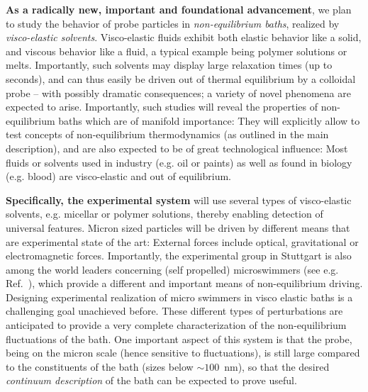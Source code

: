 \begin{workpackage}
\begin{wpdescription}
{\bf As a radically new, important and foundational advancement}, we plan to study the
behavior of probe particles in {\it non-equilibrium baths}, realized by {\it visco-elastic
  solvents}. Visco-elastic fluids exhibit both elastic behavior like a solid, and viscous
behavior like a fluid, a typical example being polymer solutions or melts. Importantly, such
solvents may display large relaxation times (up to seconds), and can thus easily be driven
out of thermal equilibrium by a colloidal probe -- with possibly dramatic consequences; a
variety of novel phenomena are expected to arise. Importantly, such studies will reveal the
properties of non-equilibrium baths which are of manifold importance: They will explicitly
allow to test concepts of non-equilibrium thermodynamics (as outlined in the main
description), and are also expected to be of great technological influence: Most fluids or
solvents used in industry (e.g. oil or paints) as well as found in biology (e.g. blood) are
visco-elastic and out of equilibrium.

{\bf Specifically, the experimental system} will use several types of visco-elastic
solvents, e.g. micellar or polymer solutions, thereby enabling detection of universal
features. Micron sized particles will be driven by different means that are experimental
state of the art: External forces include optical, gravitational or electromagnetic
forces. Importantly, the experimental group in Stuttgart is also among the world leaders
concerning (self propelled) microswimmers (see e.g. Ref.~\cite{Kummel13}), which provide a different and important means of
non-equilibrium driving. Designing experimental realization of micro swimmers in visco
elastic baths is a challenging goal unachieved before. These different types of
perturbations are anticipated to provide a very complete characterization of the
non-equilibrium fluctuations of the bath. One important aspect of this system is that the
probe, being on the micron scale (hence sensitive to fluctuations), is still large compared
to the constituents of the bath (sizes below $\sim 100$~nm), so that the desired {\it
  continuum description} of the bath can be expected to prove useful.


\end{wpdescription}
\end{workpackage}
